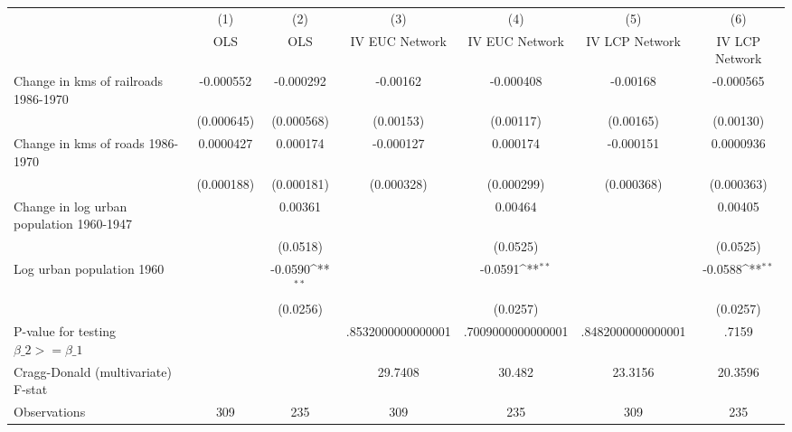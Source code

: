 {
\def\sym#1{\ifmmode^{#1}\else\(^{#1}\)\fi}
\begin{tabular}{l*{6}{c}}
\hline\hline
                &\multicolumn{1}{c}{(1)}&\multicolumn{1}{c}{(2)}&\multicolumn{1}{c}{(3)}&\multicolumn{1}{c}{(4)}&\multicolumn{1}{c}{(5)}&\multicolumn{1}{c}{(6)}\\
                &\multicolumn{1}{c}{OLS}&\multicolumn{1}{c}{OLS}&\multicolumn{1}{c}{IV EUC Network}&\multicolumn{1}{c}{IV EUC Network}&\multicolumn{1}{c}{IV LCP Network}&\multicolumn{1}{c}{IV LCP Network}\\
\hline
Change in kms of railroads 1986-1970&-0.000552         &-0.000292         & -0.00162         &-0.000408         & -0.00168         &-0.000565         \\
                &(0.000645)         &(0.000568)         &(0.00153)         &(0.00117)         &(0.00165)         &(0.00130)         \\
[1em]
Change in kms of roads 1986-1970&0.0000427         & 0.000174         &-0.000127         & 0.000174         &-0.000151         &0.0000936         \\
                &(0.000188)         &(0.000181)         &(0.000328)         &(0.000299)         &(0.000368)         &(0.000363)         \\
[1em]
Change in log urban population 1960-1947&                  &  0.00361         &                  &  0.00464         &                  &  0.00405         \\
                &                  & (0.0518)         &                  & (0.0525)         &                  & (0.0525)         \\
[1em]
Log urban population 1960&                  &  -0.0590\sym{**} &                  &  -0.0591\sym{**} &                  &  -0.0588\sym{**} \\
                &                  & (0.0256)         &                  & (0.0257)         &                  & (0.0257)         \\
\hline
P-value for testing $\beta\_{2} >= \beta\_{1}$&                  &                  &.8532000000000001         &.7009000000000001         &.8482000000000001         &    .7159         \\
Cragg-Donald (multivariate) F-stat&                  &                  &  29.7408         &   30.482         &  23.3156         &  20.3596         \\
Observations    &      309         &      235         &      309         &      235         &      309         &      235         \\
\hline\hline
\end{tabular}
}

